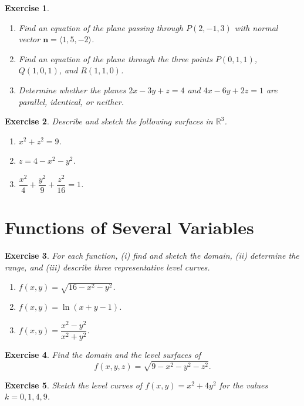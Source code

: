 \documentclass[12pt,a4paper]{article}
\theoremstyle{exercise}
\newtheorem{exercise}{Exercise}[section]
\theoremstyle{hint}
\newcommand{\R}{\mathbb{R}}
\begin{document}
\begin{exercise}
\begin{enumerate}[label=(\alph*)]
  \item Find an equation of the plane passing through $P(2,-1,3)$ with
        normal vector $\mathbf{n}=\langle 1,5,-2\rangle$.
  \item Find an equation of the plane through the three points
        $P(0,1,1)$, $Q(1,0,1)$, and $R(1,1,0)$.
  \item Determine whether the planes $2x-3y+z=4$ and
        $4x-6y+2z=1$ are parallel, identical, or neither.
\end{enumerate}
\end{exercise}

\begin{exercise}
Describe and sketch the following surfaces in $\R^3$.
\begin{enumerate}[label=(\alph*)]
  \item $x^{2}+z^{2}=9$.
  \item $z=4-x^{2}-y^{2}$.
  \item $\dfrac{x^{2}}{4}+\dfrac{y^{2}}{9}+\dfrac{z^{2}}{16}=1$.
\end{enumerate}
\end{exercise}

\section{Functions of Several Variables}

\begin{exercise}
For each function, (i) find and sketch the domain, (ii) determine the
range, and (iii) describe three representative level curves.
\begin{enumerate}[label=(\alph*)]
  \item $f(x,y)=\sqrt{16-x^{2}-y^{2}}$.
  \item $f(x,y)=\ln(x+y-1)$.
  \item $f(x,y)=\dfrac{x^{2}-y^{2}}{x^{2}+y^{2}}$.
\end{enumerate}
\end{exercise}

\begin{exercise}
Find the domain and the level surfaces of
\[
  f(x,y,z)=\sqrt{9-x^{2}-y^{2}-z^{2}}.
\]
\end{exercise}

\begin{exercise}
Sketch the level curves of $f(x,y)=x^{2}+4y^{2}$ for the values
$k=0,1,4,9$.
\end{exercise}
\end{document}
